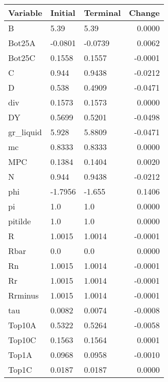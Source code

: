 \begin{table}
\centering
\label{tab:stst_comparison_end_L_limit_permanent}
\begin{tabular}{lllr}
\toprule
                Variable & Initial & Terminal &  Change \\
\midrule
                       B &    5.39 &     5.39 &  0.0000 \\
                  Bot25A & -0.0801 &  -0.0739 &  0.0062 \\
                  Bot25C &  0.1558 &   0.1557 & -0.0001 \\
                       C &   0.944 &   0.9438 & -0.0212 \\
                       D &   0.538 &   0.4909 & -0.0471 \\
                     div &  0.1573 &   0.1573 &  0.0000 \\
                      DY &  0.5699 &   0.5201 & -0.0498 \\
               gr\_liquid &   5.928 &   5.8809 & -0.0471 \\
                      mc &  0.8333 &   0.8333 &  0.0000 \\
                     MPC &  0.1384 &   0.1404 &  0.0020 \\
                       N &   0.944 &   0.9438 & -0.0212 \\
                     phi & -1.7956 &   -1.655 &  0.1406 \\
                      pi &     1.0 &      1.0 &  0.0000 \\
                 pitilde &     1.0 &      1.0 &  0.0000 \\
                       R &  1.0015 &   1.0014 & -0.0001 \\
                    Rbar &     0.0 &      0.0 &  0.0000 \\
                      Rn &  1.0015 &   1.0014 & -0.0001 \\
                      Rr &  1.0015 &   1.0014 & -0.0001 \\
                 Rrminus &  1.0015 &   1.0014 & -0.0001 \\
                     tau &  0.0082 &   0.0074 & -0.0008 \\
                  Top10A &  0.5322 &   0.5264 & -0.0058 \\
                  Top10C &  0.1563 &   0.1564 &  0.0001 \\
                   Top1A &  0.0968 &   0.0958 & -0.0010 \\
                   Top1C &  0.0187 &   0.0187 &  0.0000 \\

\end{tabular}
\end{table}
